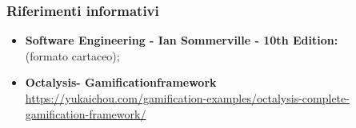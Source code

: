 \subsubsection {Riferimenti informativi}
\begin{itemize}
	\item \textbf{Software Engineering - Ian Sommerville - 10th Edition: \\}(formato cartaceo);
	\item \textbf{Octalysis\glosp - Gamification\glosp framework\glosp \\}
	\href{https://yukaichou.com/gamification-examples/octalysis-complete-gamification-framework/}{https://yukaichou.com/gamification-examples/octalysis-complete-gamification-framework/}
\end{itemize}